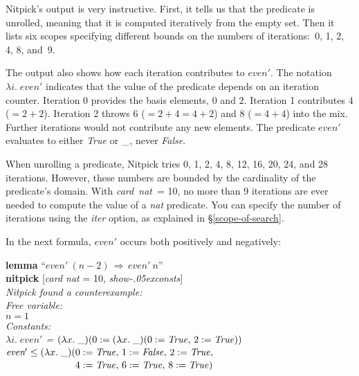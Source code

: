 \documentclass[a4paper,12pt]{article}
\def\unk{{\_}}
\def\unkef{(\lambda x.\; \unk)}
\def\Q{{\smash{\lower.2ex\hbox{$\scriptstyle?$}}}}
\renewcommand\_{\hbox{\textunderscore\kern-.05ex}}
\begin{document}
Nitpick's output is very instructive. First, it tells us that the predicate is
unrolled, meaning that it is computed iteratively from the empty set. Then it
lists six scopes specifying different bounds on the numbers of iterations:\ 0,
1, 2, 4, 8, and~9.

The output also shows how each iteration contributes to $\textit{even}'$. The
notation $\lambda i.\; \textit{even}'$ indicates that the value of the
predicate depends on an iteration counter. Iteration 0 provides the basis
elements, $0$ and $2$. Iteration 1 contributes $4$ ($= 2 + 2$). Iteration 2
throws $6$ ($= 2 + 4 = 4 + 2$) and $8$ ($= 4 + 4$) into the mix. Further
iterations would not contribute any new elements.
The predicate $\textit{even}'$ evaluates to either \textit{True} or $\unk$,
never \textit{False}.


When unrolling a predicate, Nitpick tries 0, 1, 2, 4, 8, 12, 16, 20, 24, and 28
iterations. However, these numbers are bounded by the cardinality of the
predicate's domain. With \textit{card~nat}~= 10, no more than 9 iterations are
ever needed to compute the value of a \textit{nat} predicate. You can specify
the number of iterations using the \textit{iter} option, as explained in
\S\ref{scope-of-search}.

In the next formula, $\textit{even}'$ occurs both positively and negatively:

\prew
\textbf{lemma} ``$\textit{even}'~(n - 2) \,\Longrightarrow\, \textit{even}'~n$'' \\
\textbf{nitpick} [\textit{card nat} = 10, \textit{show\_consts}] \\[2\smallskipamount]
\slshape Nitpick found a counterexample: \\[2\smallskipamount]
\hbox{}\qquad Free variable: \nopagebreak \\
\hbox{}\qquad\qquad $n = 1$ \\
\hbox{}\qquad Constants: \nopagebreak \\
\hbox{}\qquad\qquad $\lambda i.\; \textit{even}'$ = $\unkef(\!\begin{aligned}[t]
& 0 := \unkef(0 := \mathit{True},\, 2 := \mathit{True}))\end{aligned}$  \\
\hbox{}\qquad\qquad $\textit{even}' \leq \unkef(\!\begin{aligned}[t]
& 0 := \mathit{True},\, 1 := \mathit{False},\, 2 := \mathit{True},\, \\[-2pt]
& 4 := \mathit{True},\, 6 := \mathit{True},\, 8 := \mathit{True})\end{aligned}$
\postw
\end{document}
